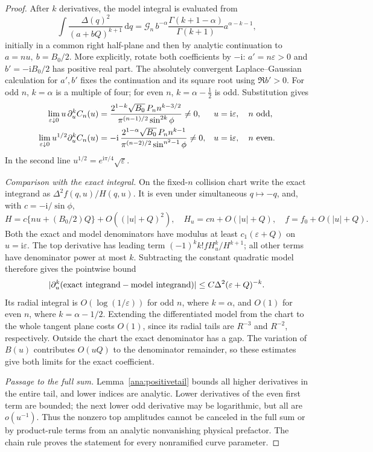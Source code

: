 \documentclass[11pt]{article}
\numberwithin{equation}{section}
\theoremstyle{definition}
\newcommand{\ii}{\mathrm i}
\newcommand{\dd}{\,\mathrm d}
\newcommand{\eps}{\varepsilon}
\begin{document}
\begin{proof}
After \(k\) derivatives, the model integral is evaluated from
\[
 \int\frac{\Delta(q)^2}{(a+bQ)^{k+1}}\dd q
 =\mathcal G_n\,b^{-\alpha}
    \frac{\Gamma(k+1-\alpha)}{\Gamma(k+1)}
    a^{\alpha-k-1},
\]
initially in a common right half-plane and then by analytic
continuation to \(a=nu,\ b=B_0/2\).
More explicitly, rotate both coefficients by \(-\ii\):
\(a'=n\eps>0\) and \(b'=-\ii B_0/2\) has positive real part.
The absolutely convergent Laplace--Gaussian calculation for
\(a',b'\) fixes the continuation and its square root using
\(\Re b'>0\).
For odd \(n\), \(k=\alpha\) is a multiple of four; for even
\(n\), \(k=\alpha-\tfrac12\) is odd. Substitution gives
\begin{align}
 \lim_{\eps\downarrow0}u\,\partial_u^k C_n(u)
 &=\frac{2^{1-k}\sqrt{B_0}\,P_n n^{k-3/2}}
         {\pi^{(n-1)/2}\sin^{2k}\phi}\ne0,
 &&u=\ii\eps,\quad n\ {\rm odd},\label{ana:oddamp}\\
 \lim_{\eps\downarrow0}u^{1/2}\partial_u^k C_n(u)
 &=-\ii\,\frac{2^{1-\alpha}\sqrt{B_0}\,P_n n^{k-1}}
         {\pi^{(n-2)/2}\sin^{n^2-1}\phi}\ne0,
 &&u=\ii\eps,\quad n\ {\rm even}.\label{ana:evenamp}
\end{align}
In the second line \(u^{1/2}=e^{\ii\pi/4}\sqrt\eps\).

\emph{Comparison with the exact integral.} On the fixed-\(n\)
collision chart write the exact integrand as
\(\Delta^2 f(q,u)/H(q,u)\). It is even under simultaneous
\(q\mapsto-q\), and, with \(c=-\ii/\sin\phi\),
\[
 H=c\{nu+(B_0/2)Q\}+O((|u|+Q)^2),\quad
 H_u=cn+O(|u|+Q),\quad f=f_0+O(|u|+Q).
\]
Both the exact and model denominators have modulus at least
\(c_1(\eps+Q)\) on \(u=\ii\eps\). The top derivative has
leading term \((-1)^kk! fH_u^k/H^{k+1}\); all other terms have
denominator power at most \(k\). Subtracting the constant quadratic
model therefore gives the pointwise bound
\[
 |\partial_u^k(\hbox{exact integrand}-\hbox{model integrand})|
       \le C\Delta^2(\eps+Q)^{-k}.
\]
Its radial integral is \(O(\log(1/\eps))\) for odd \(n\), where
\(k=\alpha\), and \(O(1)\) for even \(n\), where \(k=\alpha-1/2\).
Extending the differentiated model from the chart to the whole
tangent plane costs \(O(1)\), since its radial tails are
\(R^{-3}\) and \(R^{-2}\), respectively. Outside the chart the
exact denominator has a gap. The variation of \(B(u)\) contributes
\(O(uQ)\) to the denominator remainder, so these estimates give both
limits for the exact coefficient.

\emph{Passage to the full sum.}
Lemma~\ref{ana:positivetail} bounds all higher derivatives in the
entire tail, and lower indices are analytic. Lower derivatives of
the even first term are bounded; the next lower odd derivative
may be logarithmic, but all are \(o(u^{-1})\).
Thus the nonzero top amplitudes cannot be canceled in the full
sum or by product-rule terms from an analytic nonvanishing
physical prefactor. The chain rule proves the statement for every
nonramified curve parameter.


\end{proof}
\end{document}
